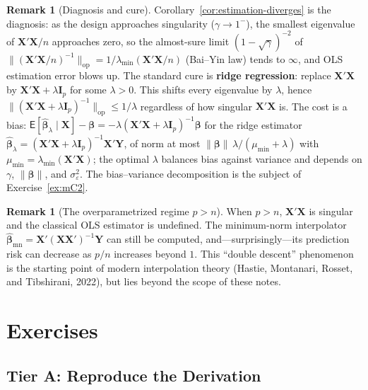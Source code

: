\documentclass[12pt,a4paper]{article}
\theoremstyle{definition}
\newtheorem{remark}[theorem]{Remark}
\newcommand\expc{\mathsf{E}}
\newcommand{\bX}{\mathbf{X}}
\newcommand{\bY}{\mathbf{Y}}
\def\bb{\boldsymbol{\beta}}
\newcommand{\bI}{\mathbf{I}}
\newcommand{\hbb}{\hat{\boldsymbol{\beta}}}
\newcommand{\opnorm}[1]{\|#1\|_{\mathrm{op}}}
\begin{document}
\begin{remark}[Diagnosis and cure]
Corollary~\ref{cor:estimation-diverges} is the diagnosis: as the design approaches singularity ($\gamma \to 1^-$), the smallest eigenvalue of $\bX'\bX/n$ approaches zero, so the almost-sure limit $(1-\sqrt\gamma)^{-2}$ of $\opnorm{(\bX'\bX/n)^{-1}} = 1/\lambda_{\min}(\bX'\bX/n)$ (Bai--Yin law) tends to $\infty$, and OLS estimation error blows up. The standard cure is \textbf{ridge regression}: replace $\bX'\bX$ by $\bX'\bX + \lambda\bI_p$ for some $\lambda > 0$. This shifts every eigenvalue by $\lambda$, hence $\opnorm{(\bX'\bX + \lambda\bI_p)^{-1}} \leqslant 1/\lambda$ regardless of how singular $\bX'\bX$ is. The cost is a bias: $\expc[\hbb_\lambda \mid \bX] - \bb = -\lambda(\bX'\bX + \lambda\bI_p)^{-1}\bb$ for the ridge estimator $\hbb_\lambda = (\bX'\bX + \lambda\bI_p)^{-1}\bX'\bY$, of norm at most $\|\bb\|\,\lambda/(\mu_{\min} + \lambda)$ with $\mu_{\min} = \lambda_{\min}(\bX'\bX)$; the optimal $\lambda$ balances bias against variance and depends on $\gamma$, $\|\bb\|$, and $\sigma_\varepsilon^2$. The bias--variance decomposition is the subject of Exercise~\ref{ex:mC2}.
\end{remark}

\begin{remark}[The overparametrized regime $p > n$]
When $p > n$, $\bX'\bX$ is singular and the classical OLS estimator is undefined. The minimum-norm interpolator $\hbb_{\mathrm{mn}} = \bX'(\bX\bX')^{-1}\bY$ can still be computed, and---surprisingly---its prediction risk can decrease as $p/n$ increases beyond $1$. This ``double descent'' phenomenon is the starting point of modern interpolation theory (Hastie, Montanari, Rosset, and Tibshirani, 2022), but lies beyond the scope of these notes.
\end{remark}

\section{Exercises}\label{sec:modern-exercises}

\setcounter{exercise}{0}

\subsection*{Tier A: Reproduce the Derivation}
\end{document}
